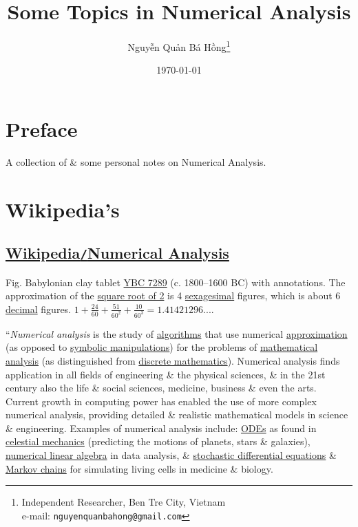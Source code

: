 \documentclass[oneside]{book}
\title{Some Topics in Numerical Analysis}
\author{\selectlanguage{vietnamese} Nguyễn Quản Bá Hồng\footnote{Independent Researcher, Ben Tre City, Vietnam\\e-mail: \texttt{nguyenquanbahong@gmail.com}}}
\date{\today}
\numberwithin{equation}{section}
\begin{document}
\maketitle
\setcounter{tocdepth}{3}
\setcounter{secnumdepth}{3}
\tableofcontents


\chapter*{Preface}

A collection of \& some personal notes on Numerical Analysis.


\chapter{Wikipedia's}

\section{\href{https://en.wikipedia.org/wiki/Numerical_analysis}{Wikipedia\texttt{/}Numerical Analysis}}
\textsf{Fig. Babylonian clay tablet \href{https://en.wikipedia.org/wiki/YBC_7289}{YBC 7289} (c. 1800--1600 BC) with annotations. The approximation of the \href{https://en.wikipedia.org/wiki/Square_root_of_2}{square root of 2} is 4 \href{https://en.wikipedia.org/wiki/Sexagesimal}{sexagesimal} figures, which is about 6 \href{https://en.wikipedia.org/wiki/Decimal}{decimal} figures. $1 + \frac{24}{60} + \frac{51}{60^2} + \frac{10}{60^3} = 1.41421296...$.}

``\textit{Numerical analysis} is the study of \href{https://en.wikipedia.org/wiki/Algorithm}{algorithms} that use numerical \href{https://en.wikipedia.org/wiki/Approximation}{approximation} (as opposed to \href{https://en.wikipedia.org/wiki/Symbolic_computation}{symbolic manipulations}) for the problems of \href{https://en.wikipedia.org/wiki/Mathematical_analysis}{mathematical analysis} (as distinguished from \href{https://en.wikipedia.org/wiki/Discrete_mathematics}{discrete mathematics}). Numerical analysis finds application in all fields of engineering \& the physical sciences, \& in the 21st century also the life \& social sciences, medicine, business \& even the arts. Current growth in computing power has enabled the use of more complex numerical analysis, providing detailed \& realistic mathematical models in science \& engineering. Examples of numerical analysis include: \href{https://en.wikipedia.org/wiki/Ordinary_differential_equation}{ODEs} as found in \href{https://en.wikipedia.org/wiki/Celestial_mechanics}{celestial mechanics} (predicting the motions of planets, stars \& galaxies), \href{https://en.wikipedia.org/wiki/Numerical_linear_algebra}{numerical linear algebra} in data analysis, \& \href{https://en.wikipedia.org/wiki/Stochastic_differential_equation}{stochastic differential equations} \& \href{https://en.wikipedia.org/wiki/Markov_chain}{Markov chains} for simulating living cells in medicine \& biology.
\end{document}
